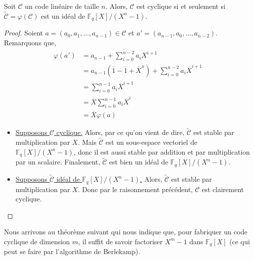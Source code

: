   \begin{proposition}
    \label{codes-correcteurs-2}
    Soit $\mathcal{C}$ un code linéaire de taille $n$. Alors, $\mathcal{C}$ est cyclique si et seulement si $\widetilde{\mathcal{C}} = \varphi(\mathcal{C})$ est un idéal de $\mathbb{F}_q[X]/(X^n-1)$.
  \end{proposition}

  \begin{proof}
    Soient $a = (a_0, a_1, \dots, a_{n-1}) \in \mathcal{C}$ et $a' = (a_{n-1}, a_0, \dots, a_{n-2})$. Remarquons que,
    \begin{align*}
      \varphi(a') &= \overline{a_{n-1} + \sum_{i=0}^{n-2} a_i X^{i+1}} \\
      &= a_{n-1} (\overline{1} - \overline{1} + \overline{X}^n) + \sum_{i=0}^{n-2} a_i \overline{X}^{i+1} \\
      &= \sum_{i=0}^{n-1} a_i \overline{X}^{i+1} \\
      &= \overline{X}\sum_{i=0}^{n-1} a_i \overline{X}^{i} \\
      &= \overline{X}\varphi(a)
    \end{align*}
    \begin{itemize}
      \item \uline{Supposons $\mathcal{C}$ cyclique.} Alors, par ce qu'on vient de dire, $\widetilde{\mathcal{C}}$ est stable par multiplication par $X$. Mais $\widetilde{\mathcal{C}}$ est un sous-espace vectoriel de $\mathbb{F}_q[X]/(X^n-1)$, donc il est aussi stable par addition et par multiplication par un scalaire. Finalement, $\widetilde{\mathcal{C}}$ est bien un idéal de $\mathbb{F}_q[X]/(X^n-1)$.
      \item \uline{Supposons $\widetilde{\mathcal{C}}$ idéal de $\mathbb{F}_q[X]/(X^n-1)$.} Alors, $\widetilde{\mathcal{C}}$ est stable par multiplication par $X$. Donc par le raisonnement précédent, $\mathcal{C}$ est clairement cyclique.
    \end{itemize}
  \end{proof}

  Nous arrivons au théorème suivant qui nous indique que, pour fabriquer un code cyclique de dimension $m$, il suffit de savoir factoriser $X^m - 1$ dans $\mathbb{F}_q[X]$ (ce qui peut se faire par l'algorithme de Berlekamp).

